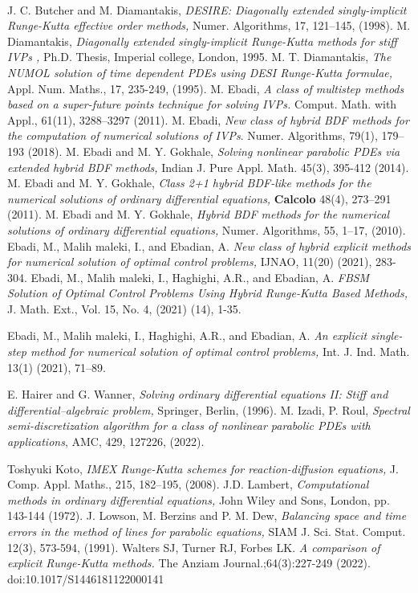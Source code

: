 ‎\documentclass[a4paper,10pt]{article}‎
\begin{document}
\begin{thebibliography}{}
  J. C. Butcher and M. Diamantakis, \emph{DESIRE: Diagonally extended  singly-implicit Runge-Kutta effective order methods,} Numer. Algorithms, 17, 121--145, (1998).
  M. Diamantakis, \emph{Diagonally extended  singly-implicit Runge-Kutta methods for stiff IVPs ,} Ph.D. Thesis, Imperial college, London, 1995.
 M. T. Diamantakis, \emph{The NUMOL solution of time dependent PDEs using DESI Runge-Kutta formulae,} Appl. Num. Maths., 17, 235-249, (1995).
 M. Ebadi,  {\em A class of multistep methods based on a super-future points technique for solving IVPs.}  Comput. Math. with Appl., 61(11), 3288--3297 (2011).
 M. Ebadi,  {\em New class of hybrid BDF methods for the computation of numerical solutions of IVPs}. Numer. Algorithms, 79(1), 179--193 (2018).
 M. Ebadi and  M. Y. Gokhale, \emph{Solving nonlinear parabolic PDEs via extended hybrid BDF methods,} Indian J. Pure Appl. Math. 45(3), 395-412 (2014).
 M. Ebadi and M. Y. Gokhale, \emph{Class 2+1 hybrid BDF-like methods for the numerical solutions of ordinary differential equations,} \textbf{Calcolo} 48(4), 273--291 (2011).
 M. Ebadi and M. Y. Gokhale,  \emph{Hybrid BDF methods for the numerical solutions of ordinary differential equations,} Numer. Algorithms, 55, 1--17, (2010).
  Ebadi, M., Malih maleki, I.,  and Ebadian, A. \emph{New class of hybrid explicit methods for numerical solution of optimal control problems,} IJNAO, 11(20) (2021), 283-304.
  Ebadi, M., Malih maleki, I., Haghighi, A.R., and Ebadian, A.  \emph{FBSM Solution of Optimal Control Problems
Using Hybrid Runge-Kutta Based Methods,} J. Math. Ext.,
Vol. 15, No. 4, (2021) (14), 1-35.

 Ebadi, M., Malih maleki, I., Haghighi, A.R., and Ebadian, A. \emph{An explicit
single-step method for numerical solution of optimal control problems,} Int.
J. Ind. Math. 13(1) (2021), 71–89.


  E. Hairer and G. Wanner,\emph{ Solving ordinary differential equations II: Stiff and differential--algebraic problem,}  Springer, Berlin, (1996).
M. Izadi, P. Roul,  \emph{Spectral semi-discretization algorithm for a class of nonlinear parabolic PDEs with applications}, AMC, 429, 127226, (2022).


 Toshyuki Koto,  \emph{IMEX Runge-Kutta schemes for reaction-diffusion  equations,} J. Comp. Appl. Maths., 215, 182--195, (2008).
 J.D. Lambert, \emph{Computational methods in ordinary differential equations,}  John Wiley and Sons, London, pp. 143-144 (1972).
 J. Lowson, M. Berzins and P. M. Dew, \emph{Balancing space and time errors in the method of lines for parabolic equations, } SIAM J. Sci. Stat. Comput. 12(3), 573-594, (1991).
Walters SJ, Turner RJ, Forbes LK. \emph{A comparison of explicit Runge-Kutta methods.} The Anziam Journal.;64(3):227-249 (2022). doi:10.1017/S1446181122000141
\end{thebibliography}
\end{document}
